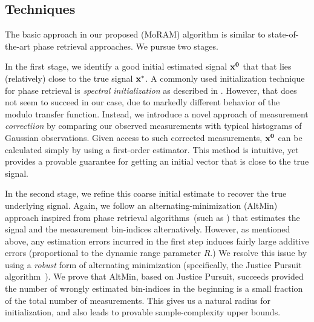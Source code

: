 \subsection{Techniques}

The basic approach in our proposed (MoRAM) algorithm is similar to state-of-the-art phase retrieval approaches. We pursue two stages. 

In the first stage, we identify a good initial estimated signal $\mathbf{x^0}$ that that lies (relatively) close to the true signal $\mathbf{x^*}$. A commonly used initialization technique for phase retrieval is \emph{spectral initialization} as described in \cite{netrapalli2013phase}. However, that does not seem to succeed in our case, due to markedly different behavior of the modulo transfer function. %
Instead, we introduce a novel approach of measurement \emph{correctiion} by comparing our observed measurements with typical histograms of Gaussian observations. Given access to such corrected measurements, $\mathbf{x^0}$ can be calculated simply by using a first-order estimator. This method is intuitive, yet provides %
	a provable guarantee for getting an initial vector that is close to the true signal. 

In the second stage, we refine this coarse initial estimate to recover the true underlying signal. Again, we follow an alternating-minimization (AltMin) approach inspired from phase retrieval algorithms~(such as \cite{netrapalli2013phase}) that estimates the signal and the measurement bin-indices alternatively. However, as mentioned above, any estimation errors incurred in the first step induces fairly large additive errors (proportional to the dynamic range parameter $R$.) We resolve this issue by using a \emph{robust} form of alternating minimization (specifically, the Justice Pursuit algorithm~\cite{Laska2009}). We prove that AltMin, based on Justice Pursuit, succeeds provided the number of wrongly estimated bin-indices in the beginning is a small fraction of the total number of measurements. This gives us a natural radius for initialization, and also leads to provable sample-complexity upper bounds.   %


